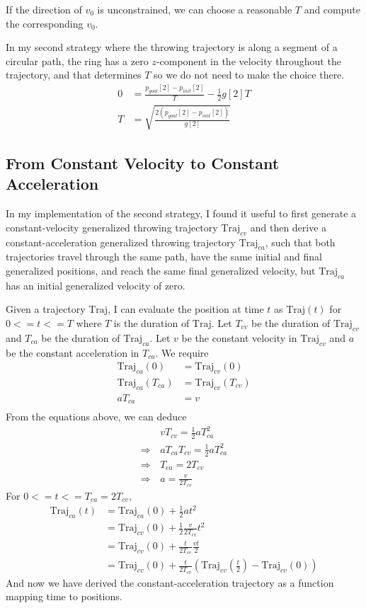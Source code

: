 \documentclass[conference]{IEEEtran}
\begin{document}
If the direction of $v_0$ is unconstrained, we can choose a reasonable $T$ and compute the corresponding $v_0$.

In my second strategy where the throwing trajectory is along a segment of a circular path, the ring has a zero $z$-component in the velocity throughout the trajectory, and that determines $T$ so we do not need to make the choice there.
\begin{align*}
0 &= \frac{p_{goal}[2] - p_{init}[2]}{T} - \frac{1}{2} g[2] T \\
T &= \sqrt{\frac{2 (p_{goal}[2] - p_{init}[2])}{g[2]}}
\end{align*}

\subsection{From Constant Velocity to Constant Acceleration}
\label{const_acc}
In my implementation of the second strategy, I found it useful to first generate a constant-velocity generalized throwing trajectory $\text{Traj}_{cv}$ and then derive a constant-acceleration generalized throwing trajectory $\text{Traj}_{ca}$, such that both trajectories travel through the same path, have the same initial and final generalized positions, and reach the same final generalized velocity, but $\text{Traj}_{ca}$ has an initial generalized velocity of zero.

Given a trajectory $\text{Traj}$, I can evaluate the position at time $t$ as $\text{Traj}(t)$ for $0 <= t <= T$ where $T$ is the duration of $\text{Traj}$. Let $T_{cv}$ be the duration of $\text{Traj}_{cv}$ and $T_{ca}$ be the duration of $\text{Traj}_{ca}$. Let $v$ be the constant velocity in $\text{Traj}_{cv}$ and $a$ be the constant acceleration in $T_{ca}$. We require
\begin{align*}
\text{Traj}_{ca}(0) &= \text{Traj}_{cv}(0) \\
\text{Traj}_{ca}(T_{ca}) &= \text{Traj}_{cv}(T_{cv}) \\
a T_{ca} &= v \\
\end{align*}
From the equations above, we can deduce
\begin{align*}
&v T_{cv} = \frac{1}{2} a T_{ca}^2 \\
\Rightarrow\, &a T_{ca} T_{cv} = \frac{1}{2} a T_{ca}^2 \\
\Rightarrow\, &T_{ca} = 2 T_{cv} \\
\Rightarrow\, &a = \frac{v}{2 T_{cv}}
\end{align*}
For $0 <= t <= T_{ca} = 2 T_{cv}$,
\begin{align*}
\text{Traj}_{ca}(t) &= \text{Traj}_{ca}(0) + \frac{1}{2} a t^2 \\
&= \text{Traj}_{cv}(0) + \frac{1}{2} \frac{v}{2 T_{cv}} t^2 \\
&= \text{Traj}_{cv}(0) + \frac{t}{2 T_{cv}} \frac{v t}{2} \\
&= \text{Traj}_{cv}(0) + \frac{t}{2 T_{cv}} (\text{Traj}_{cv}(\frac{t}{2}) - \text{Traj}_{cv}(0))
\end{align*}
And now we have derived the constant-acceleration trajectory as a function mapping time to positions.
\end{document}
